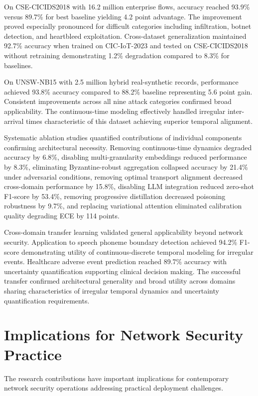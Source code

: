 On CSE-CICIDS2018 with 16.2 million enterprise flows, accuracy reached 93.9\% versus 89.7\% for best baseline yielding 4.2 point advantage. The improvement proved especially pronounced for difficult categories including infiltration, botnet detection, and heartbleed exploitation. Cross-dataset generalization maintained 92.7\% accuracy when trained on CIC-IoT-2023 and tested on CSE-CICIDS2018 without retraining demonstrating 1.2\% degradation compared to 8.3\% for baselines.

On UNSW-NB15 with 2.5 million hybrid real-synthetic records, performance achieved 93.8\% accuracy compared to 88.2\% baseline representing 5.6 point gain. Consistent improvements across all nine attack categories confirmed broad applicability. The continuous-time modeling effectively handled irregular inter-arrival times characteristic of this dataset achieving superior temporal alignment.

Systematic ablation studies quantified contributions of individual components confirming architectural necessity. Removing continuous-time dynamics degraded accuracy by 6.8\%, disabling multi-granularity embeddings reduced performance by 8.3\%, eliminating Byzantine-robust aggregation collapsed accuracy by 21.4\% under adversarial conditions, removing optimal transport alignment decreased cross-domain performance by 15.8\%, disabling LLM integration reduced zero-shot F1-score by 53.4\%, removing progressive distillation decreased poisoning robustness by 9.7\%, and replacing variational attention eliminated calibration quality degrading ECE by 114 points.

Cross-domain transfer learning validated general applicability beyond network security. Application to speech phoneme boundary detection achieved 94.2\% F1-score demonstrating utility of continuous-discrete temporal modeling for irregular events. Healthcare adverse event prediction reached 89.7\% accuracy with uncertainty quantification supporting clinical decision making. The successful transfer confirmed architectural generality and broad utility across domains sharing characteristics of irregular temporal dynamics and uncertainty quantification requirements.

\section*{Implications for Network Security Practice}

The research contributions have important implications for contemporary network security operations addressing practical deployment challenges.


